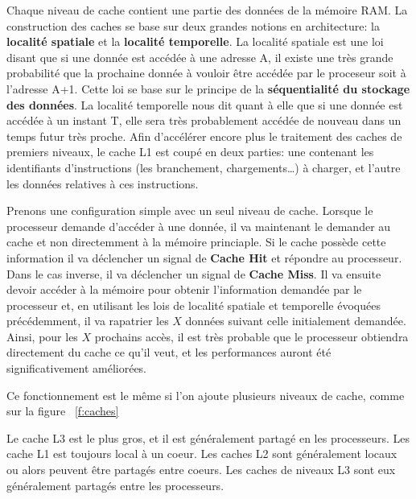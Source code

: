       Chaque niveau de cache contient une partie des données de la mémoire
      RAM. La construction des caches se base sur deux grandes notions en
      architecture: la \textbf{localité spatiale} et la \textbf{localité
        temporelle}. La localité spatiale est une loi disant que si une donnée
      est accédée à une adresse A, il existe une très grande probabilité que la
      prochaine donnée à vouloir être accédée par le proceseur soit à l'adresse
      A+1. Cette loi se base sur le principe de la \textbf{séquentialité du
        stockage des données}. La localité temporelle nous dit quant à elle que
      si une donnée est accédée à un instant T, elle sera très probablement
      accédée de nouveau dans un temps futur très proche. Afin d'accélérer
      encore plus le traitement des caches de premiers niveaux, le cache L1 est
      coupé en deux parties: une contenant les identifiants d'instructions (les
      branchement, chargements\ldots) à charger, et l'autre les données
      relatives à ces instructions.

      Prenons une configuration simple avec un seul niveau de cache. Lorsque le
      processeur demande d'accéder à une donnée, il va maintenant le demander au
      cache et non directemment à la mémoire princiaple. Si le cache possède
      cette information il va déclencher un signal de \textbf{Cache Hit} et
      répondre au processeur. Dans le cas inverse, il va déclencher un signal de
      \textbf{Cache Miss}. Il va ensuite devoir accéder à la mémoire pour
      obtenir l'information demandée par le processeur et, en utilisant les lois
      de localité spatiale et temporelle évoquées précédemment, il va rapatrier
      les $X$ données suivant celle initialement demandée. Ainsi, pour les $X$
      prochains accès, il est très probable que le processeur obtiendra
      directement du cache ce qu'il veut, et les performances auront été
      significativement améliorées.

      Ce fonctionnement est le même si l'on ajoute plusieurs niveaux de cache,
      comme sur la figure ~\ref{f:caches}


      Le cache L3 est le plus gros, et il est généralement partagé en les
      processeurs. Les cache L1 est toujours local à un coeur. Les caches L2
      sont généralement locaux ou alors peuvent être partagés entre coeurs. Les
      caches de niveaux L3 sont eux généralement partagés entre les processeurs.

